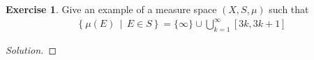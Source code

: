 \documentclass[letterpaper, 12pt, english]{article}
\theoremstyle{definition}
\theoremstyle{definition}
\newtheorem{problem}{Exercise}
\theoremstyle{definition}
\newenvironment{sol}{\begin{proof}[Solution]}{\end{proof}}
\theoremstyle{plain} %
\theoremstyle{plain} %
\theoremstyle{plain} %
\theoremstyle{plain} %
\theoremstyle{remark}
\begin{document}
\setcounter{problem}{3}
\begin{problem}
Give an example of a measure space $ (X, S, \mu) $ such that
\begin{gather*}
    \left\{ \mu(E) \,\middle|\, E \in S \right\} =
    \{ \infty \} \cup \bigcup_{k=1}^{ \infty} [3k, 3k +1]
\end{gather*}
\begin{sol}
%    
%    
\end{sol}
\end{problem}
\end{document}
